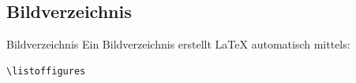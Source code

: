 \subsection{Bildverzeichnis}
\begin{frame}[fragile]{Bildverzeichnis}
Ein Bildverzeichnis erstellt \LaTeX{} automatisch mittels:

\begin{lstlisting}[style=tex]
\listoffigures
\end{lstlisting}

\end{frame}